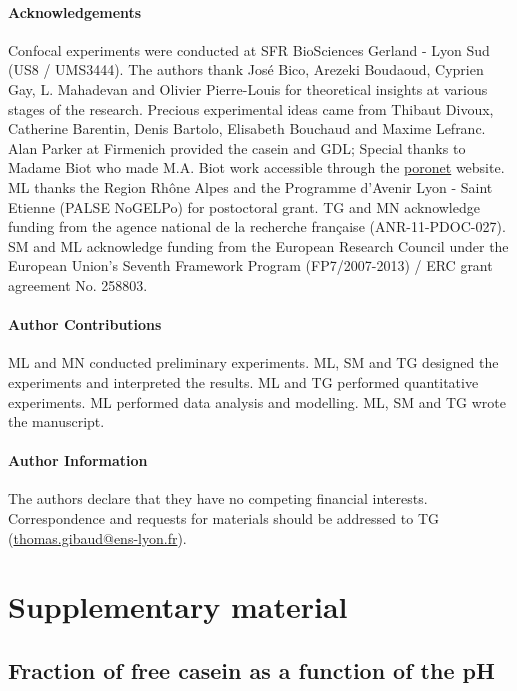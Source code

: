 \documentclass[twocolumn,superscriptaddress,showpacs,preprintnumbers,
amsmath,amssymb,prl]{revtex4-1}
\begin{document}
\paragraph*{Acknowledgements}
Confocal experiments were conducted at SFR BioSciences Gerland - Lyon Sud (US8 / UMS3444).
The authors thank Jos\'e Bico, Arezeki Boudaoud, Cyprien Gay, L. Mahadevan and Olivier Pierre-Louis for theoretical insights at various stages of the research. 
Precious experimental ideas came from Thibaut Divoux, Catherine Barentin, Denis Bartolo, Elisabeth Bouchaud and Maxime Lefranc.
Alan Parker at Firmenich provided the casein and GDL; 
Special thanks to Madame Biot who made M.A. Biot work accessible through the \href{http://www.olemiss.edu/sciencenet/poronet/}{poronet} website. 
ML thanks the Region Rhône Alpes and the Programme d'Avenir Lyon - Saint Etienne (PALSE NoGELPo) for postoctoral grant. 
TG and MN acknowledge funding from the agence national de la recherche fran\c{c}aise (ANR-11-PDOC-027). 
SM and ML acknowledge funding from the European Research Council under the European Union's Seventh Framework Program (FP7/2007-2013) / ERC grant agreement No. 258803.


\paragraph*{Author Contributions}
ML and MN conducted preliminary experiments. ML, SM and TG designed the experiments and interpreted the results. ML and TG performed quantitative experiments. ML performed data analysis and modelling. ML, SM and TG wrote the manuscript.


\paragraph*{Author Information} 
The authors declare that they have no competing financial interests. 
Correspondence and requests for materials should be addressed to TG (\href{mailto:thomas.gibaud@ens-lyon.fr}{thomas.gibaud@ens-lyon.fr}).






\clearpage
\newpage
\setcounter{figure}{0}

\section*{Supplementary material}


\subsection*{Fraction of free casein as a function of the pH}
\end{document}
